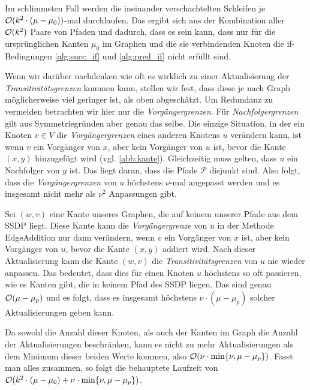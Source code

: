 \begin{beweis}
	Im schlimmsten Fall werden die ineinander verschachtelten Schleifen je $\mathcal{O}(k^2 \cdot (\mu - \mu_0))$-mal durchlaufen. Das ergibt sich aus der Kombination aller $\mathcal{O}(k^2)$ Paare von Pfaden und dadurch, dass es sein kann, dass nur für die ursprünglichen Kanten $\mu_0$ im Graphen und die sie verbindenden Knoten die if-Bedingungen \ref{alg:succ_if} und \ref{alg:pred_if} nicht erfüllt sind. 
	
	Wenn wir darüber nachdenken wie oft es wirklich zu einer Aktualisierung der \emph{Transitivitätsgrenzen} kommen kann, stellen wir fest, dass diese je nach Graph möglicherweise viel geringer ist, als oben abgeschätzt. Um Redundanz zu vermeiden betrachten wir hier nur die \emph{Vorgängergrenzen}. Für \emph{Nachfolgergrenzen} gilt aus Symmetriegründen aber genau das selbe. Die einzige Situation, in der ein Knoten $v \in V$ die \emph{Vorgängergrenzen} eines anderen Knotens $u$ verändern kann, ist wenn $v$ ein Vorgänger von $x$, aber kein Vorgänger von $u$ ist, bevor die Kante $(x,y)$ hinzugefügt wird (vgl. \ref{abb:kante}). Gleichzeitig muss gelten, dass $u$ ein Nachfolger von $y$ ist. Das liegt daran, dass die Pfade $\mathcal{P}$ disjunkt sind. Also folgt, dass die \emph{Vorgängergrenzen} von $u$ höchstens $\nu$-mal angepasst werden und es insgesamt nicht mehr als $\nu^2$ Anpassungen gibt. 

	Sei $(w,v)$ eine Kante unseres Graphen, die auf keinem unserer Pfade aus dem SSDP liegt. Diese Kante kann die \emph{Vorgängergrenze} von $u$ in der Methode \textrm{EdgeAddition} nur dann verändern, wenn $v$ ein Vorgänger von $x$ ist, aber kein Vorgänger von $u$, bevor die Kante $(x,y)$ addiert wird. Nach dieser Aktualisierung kann die Kante $(w,v)$ die \emph{Transitivitätsgrenzen} von $u$ nie wieder anpassen. Das bedeutet, dass dies für einen Knoten $u$ höchstens so oft passieren, wie es Kanten gibt, die in keinem Pfad des SSDP liegen. Das sind genau $\mathcal{O}(\mu - \mu_p)$ und es folgt, dass es insgesamt höchstens $\nu \cdot (\mu - \mu_p)$ solcher Aktualisierungen geben kann.
	
	Da sowohl die Anzahl dieser Knoten, als auch der Kanten im Graph die Anzahl der Aktualisierungen beschränken, kann es nicht zu mehr Aktualisierungen als dem Minimum dieser beiden Werte kommen, also $\mathcal{O}(\nu \cdot \min\{\nu, \mu - \mu_p\})$. Fasst man alles zusammen, so folgt die behauptete Laufzeit von $\mathcal{O}(k^2 \cdot (\mu - \mu_0) + \nu \cdot \min\{\nu, \mu - \mu_p\})$.
\end{beweis}

